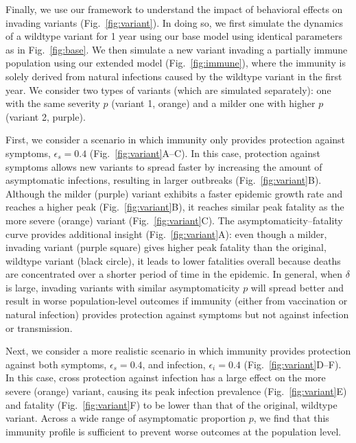 \documentclass[12pt]{article}
\newcommand{\fref}[1]{Fig.~\ref{fig:#1}}
\begin{document}
Finally, we use our framework to understand the impact of behavioral effects on invading variants (\fref{variant}).
In doing so, we first simulate the dynamics of a wildtype variant for 1 year using our base model using identical parameters as in \fref{base}.
We then simulate a new variant invading a partially immune population using our extended model (\fref{immune}), where the immunity is solely derived from natural infections caused by the wildtype variant in the first year.
We consider two types of variants (which are simulated separately): one with the same severity $p$ (variant 1, orange) and a milder one with higher $p$ (variant 2, purple).

First, we consider a scenario in which immunity only provides protection against symptoms, $\epsilon_s = 0.4$ (\fref{variant}A--C).
In this case, protection against symptoms allows new variants to spread faster by increasing the amount of asymptomatic infections, resulting in larger outbreaks (\fref{variant}B).
Although the milder (purple) variant exhibits a faster epidemic growth rate and reaches a higher peak (\fref{variant}B), it reaches similar peak fatality as the more severe (orange) variant (\fref{variant}C).
The asymptomaticity--fatality curve provides additional insight (\fref{variant}A): even though a milder, invading variant (purple square) gives higher peak fatality than the original, wildtype variant (black circle), it leads to lower fatalities overall because deaths are concentrated over a shorter period of time in the epidemic.
In general, when $\delta$ is large, invading variants with similar asymptomaticity $p$ will spread better and result in worse population-level outcomes if immunity (either from vaccination or natural infection) provides protection against symptoms but not against infection or transmission.

Next, we consider a more realistic scenario in which immunity provides protection against both symptoms, $\epsilon_s = 0.4$, and infection, $\epsilon_i = 0.4$ (\fref{variant}D--F).
In this case, cross protection against infection has a large effect on the more severe (orange) variant, causing its peak infection prevalence (\fref{variant}E) and fatality (\fref{variant}F) to be lower than that of the original, wildtype variant.
Across a wide range of asymptomatic proportion $p$, we find that this immunity profile is sufficient to prevent worse outcomes at the population level.
\end{document}
